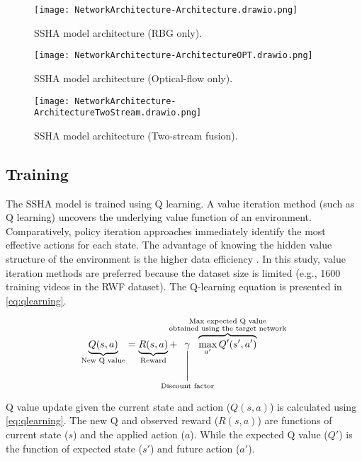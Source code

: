 \documentclass[review]{elsarticle}
\begin{document}
\begin{figure*}[!htbp]
    \centering
    \texttt{[image: NetworkArchitecture-Architecture.drawio.png]}
    \caption{SSHA model architecture (RBG only).}
    \label{fig:architecture}
\end{figure*}

\begin{figure*}[!htbp]
    \centering
    \texttt{[image: NetworkArchitecture-ArchitectureOPT.drawio.png]}
    \caption{SSHA model architecture (Optical-flow only).}
    \label{fig:architecture_opt}
\end{figure*}

\begin{figure*}[!htbp]
    \centering
    \texttt{[image: NetworkArchitecture-ArchitectureTwoStream.drawio.png]}
    \caption{SSHA model architecture (Two-stream fusion).}
    \label{fig:architecture_twostream}
\end{figure*}


\subsection{Training}

The SSHA model is trained using Q learning. A value iteration method (such as Q learning) uncovers the underlying value function of an environment. Comparatively, policy iteration approaches immediately identify the most effective actions for each state. The advantage of knowing the hidden value structure of the environment is the higher data efficiency {\citep{hamadouche2021comparison}}. In this study, value iteration methods are preferred because the dataset size is limited (e.g., 1600 training videos in the RWF dataset). The Q-learning equation is presented in {\autoref{eq:qlearning}}.

\begin{equation}
\label{eq:qlearning}
\underbrace{Q(s,a)}_{\scriptstyle\text{New Q value}}=\underbrace{R(s,a)}_{\scriptstyle\text{Reward}}+\mkern-30mu\underset{\text{Discount factor}}{\underset{\Biggl|}{\gamma}}\mkern-85mu\overbrace{\underset{a'}\max \, Q'(s',a')}^{\scriptstyle\substack{\text{Max expected Q value} \\ \text{obtained using the target network}}}
\end{equation}

{Q value update given the current state and action ($Q(s, a)$) is calculated using} \autoref{eq:qlearning}{. The new Q and observed reward ($R(s, a)$) are functions of current state ($s$) and the applied action ($a$). While the expected Q value ($Q'$) is the function of expected state ($s'$) and future action ($a'$).
}
\end{document}
